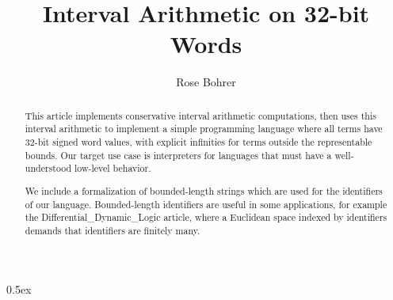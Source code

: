 \documentclass[11pt,a4paper]{article}
\begin{document}
\title{Interval Arithmetic on 32-bit Words}
\author{Rose Bohrer}
\maketitle

\begin{abstract}
 This article implements conservative interval arithmetic
 computations, then uses this interval arithmetic to implement a
 simple programming language where all terms have 32-bit signed word
 values, with explicit infinities for terms outside the representable
 bounds. Our target use case is interpreters for languages that must
 have a well-understood low-level behavior.

 We include a formalization of bounded-length strings which are used
 for the identifiers of our language. Bounded-length identifiers are
 useful in some applications, for example the
 Differential\_Dynamic\_Logic \cite{Differential_Dynamic_Logic-AFP}
 article, where a Euclidean space indexed by identifiers demands that
 identifiers are finitely many.
\end{abstract}
\newpage

\tableofcontents
\newpage

\parindent 0pt\parskip 0.5ex





\end{document}
